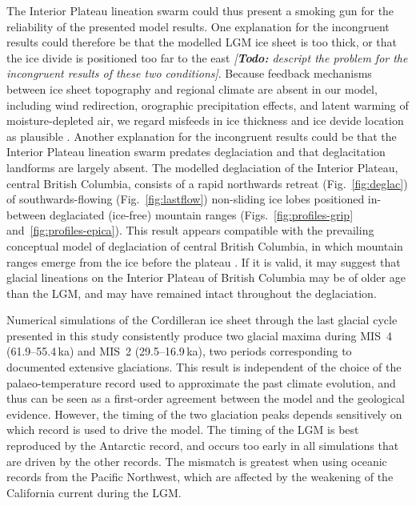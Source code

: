 \documentclass[tc, manuscript]{copernicus}
\newcommand{\todo}[1]{\emph{[\textbf{Todo:} #1]}}
\begin{document}
The Interior Plateau lineation swarm could thus present a smoking gun for the
reliability of the presented model results. One explanation for the incongruent
results could therefore be that the modelled LGM ice sheet is too thick, or
that the ice divide is positioned too far to the east \todo{descript the
problem for the incongruent results of these two conditions}. Because feedback
mechanisms between ice sheet topography and regional climate are absent in our
model, including wind redirection, orographic precipitation effects, and latent
warming of moisture-depleted air, we regard misfeeds in ice thickness and ice
devide location as plausible \citep{Seguinot.etal.2014}. Another explanation
for the incongruent results could be that the Interior Plateau lineation swarm
predates deglaciation and that deglacitation landforms are largely absent. The
modelled deglaciation of the Interior Plateau, central British Columbia,
consists of a rapid northwards retreat (Fig.~\ref{fig:deglac}) of
southwards-flowing (Fig.~\ref{fig:lastflow}) non-sliding ice lobes positioned
in-between deglaciated (ice-free) mountain ranges
(Figs.~\ref{fig:profiles-grip} and~\ref{fig:profiles-epica}). This result
appears compatible with the prevailing conceptual model of deglaciation of
central British Columbia, in which mountain ranges emerge from the ice before
the plateau \citep[Fig.~7]{Fulton.1991}. If it is valid, it may suggest that
glacial lineations on the Interior Plateau of British Columbia may be of older
age than the LGM, and may have remained intact throughout the deglaciation.


\conclusions
\label{sec:concl}

Numerical simulations of the Cordilleran ice sheet through the last glacial
cycle presented in this study consistently produce two glacial maxima during
MIS~4 (61.9--55.4\,ka) and MIS~2 (29.5--16.9\,ka), two periods
corresponding to documented extensive glaciations. This result is
independent of the choice of the palaeo-temperature record used to approximate
the past climate evolution, and thus
can be seen as a first-order agreement between the model and the geological
evidence. However, the timing of the two glaciation peaks depends sensitively
on which record
is used to drive the model. The timing of the LGM is best
reproduced by the Antarctic record, and occurs too early in all simulations
that are driven by the other records. The mismatch is greatest when using
oceanic records from the Pacific Northwest, which are affected by the
weakening of the California current during the LGM.
\end{document}
